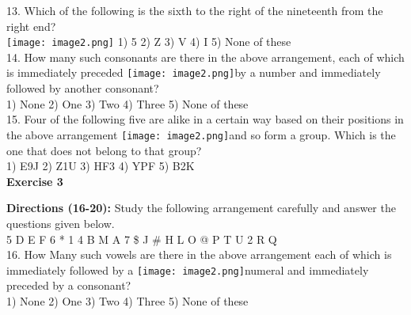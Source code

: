 \documentclass[
]{article}
\begin{document}
13. Which of the following is the sixth to the right of the nineteenth from the right end?\\
\texttt{[image: image2.png]}
1) 5 \hspace{2mm}2) Z \hspace{2mm}3) V \hspace{2mm}4) I \hspace{2mm}5) None of these\\

14. How many such consonants are there in the above arrangement, each of which is immediately preceded \texttt{[image: image2.png]}by a number and immediately followed by another consonant?\\
1) None \hspace{2mm}2) One \hspace{2mm}3) Two \hspace{2mm}4) Three \hspace{2mm}5) None of these\\

15. Four of the following five are alike in a certain way based on their positions in the above arrangement \texttt{[image: image2.png]}and so form a group. Which is the one that does not belong to that group?\\
1) E9J \hspace{2mm}2) Z1U \hspace{2mm}3) HF3 \hspace{2mm}4) YPF \hspace{2mm}5) B2K\\

\textbf{Exercise 3}

\textbf{Directions (16-20):} Study the following arrangement carefully and answer the questions given
below.\\
5 D E F 6 * 1 4 B M A 7 \$ J \# H L O @ P T U 2 R Q\\
16. How Many such vowels are there in the above arrangement each of which is immediately followed by a \texttt{[image: image2.png]}numeral and immediately preceded by a consonant?\\
1) None \hspace{2mm}2) One \hspace{2mm}3) Two \hspace{2mm}4) Three \hspace{2mm}5) None of these\\
\end{document}
